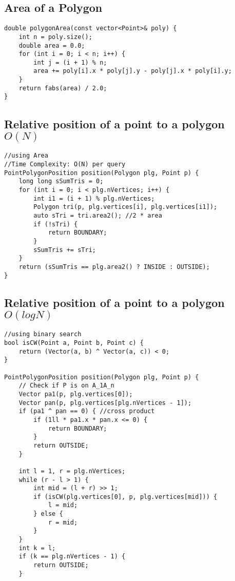 \documentclass[11pt,a4paper]{article}
\begin{document}
\begin{multicols*}{2}
\subsection{Area of a Polygon}
\begin{lstlisting}
double polygonArea(const vector<Point>& poly) {
    int n = poly.size();
    double area = 0.0;
    for (int i = 0; i < n; i++) {
        int j = (i + 1) % n;
        area += poly[i].x * poly[j].y - poly[j].x * poly[i].y;
    }
    return fabs(area) / 2.0;
}
\end{lstlisting}

\subsection{Relative position of a point to a polygon $O(N)$}
\begin{lstlisting}
//using Area
//Time Complexity: O(N) per query 
PointPolygonPosition position(Polygon plg, Point p) {
    long long sSumTris = 0;
    for (int i = 0; i < plg.nVertices; i++) {
        int i1 = (i + 1) % plg.nVertices;
        Polygon tri(p, plg.vertices[i], plg.vertices[i1]);
        auto sTri = tri.area2(); //2 * area
        if (!sTri) {
            return BOUNDARY;
        }
        sSumTris += sTri;
    }
    return (sSumTris == plg.area2() ? INSIDE : OUTSIDE);
}
\end{lstlisting}

\subsection{Relative position of a point to a polygon $O(logN)$}
\begin{lstlisting}
//using binary search
bool isCW(Point a, Point b, Point c) {
    return (Vector(a, b) ^ Vector(a, c)) < 0;
}

PointPolygonPosition position(Polygon plg, Point p) {
    // Check if P is on A_1A_n 
    Vector pa1(p, plg.vertices[0]);
    Vector pan(p, plg.vertices[plg.nVertices - 1]);
    if (pa1 ^ pan == 0) { //cross product
        if (1ll * pa1.x * pan.x <= 0) {
            return BOUNDARY;
        }
        return OUTSIDE;
    }

    int l = 1, r = plg.nVertices;
    while (r - l > 1) {
        int mid = (l + r) >> 1;
        if (isCW(plg.vertices[0], p, plg.vertices[mid])) {
            l = mid;
        } else {
            r = mid;
        }
    }
    int k = l;
    if (k == plg.nVertices - 1) {
        return OUTSIDE;
    }


\end{lstlisting}
\end{multicols*}
\end{document}
